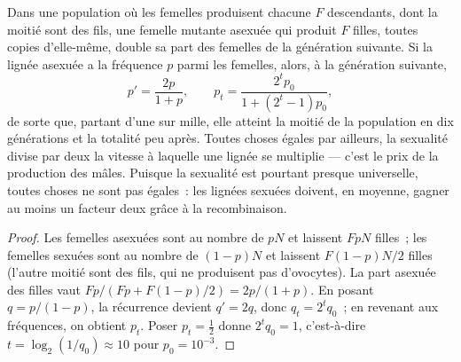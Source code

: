 \begin{theorem}\label{thm:b2:asexual-reproduction:twofold}
Dans une population où les femelles produisent chacune $F$ descendants,
dont la moitié sont des fils, une femelle mutante asexuée qui produit
$F$ filles, toutes copies d'elle-même, double sa part des femelles de la
génération suivante. Si la lignée asexuée a la fréquence $p$ parmi les
femelles, alors, à la génération suivante,
\[
p' = \frac{2p}{1 + p}, \qquad p_t = \frac{2^t p_0}{1 + (2^t - 1)p_0},
\]
de sorte que, partant d'une sur mille, elle atteint la moitié de la
population en dix générations et la totalité peu après. Toutes choses
égales par ailleurs, la sexualité divise par deux la vitesse à laquelle
une lignée se multiplie --- c'est le prix de la production des mâles.
Puisque la sexualité est pourtant presque universelle, toutes choses ne
sont pas égales~: les lignées sexuées doivent, en moyenne, gagner au
moins un facteur deux grâce à la recombinaison.
\end{theorem}
\begin{proof}
Les femelles asexuées sont au nombre de $pN$ et laissent $FpN$ filles~;
les femelles sexuées sont au nombre de $(1 - p)N$ et laissent
$F(1 - p)N/2$ filles (l'autre moitié sont des fils, qui ne produisent
pas d'ovocytes). La part asexuée des filles vaut
$Fp/(Fp + F(1 - p)/2) = 2p/(1 + p)$. En posant $q = p/(1 -
p)$, la récurrence devient $q' = 2q$, donc $q_t = 2^t q_0$~; en revenant
aux fréquences, on obtient $p_t$. Poser $p_t = \tfrac12$ donne $2^t q_0 = 1$,
c'est-à-dire
$t = \log_2(1/q_0) \approx 10$ pour $p_0 = 10^{-3}$.
\end{proof}

